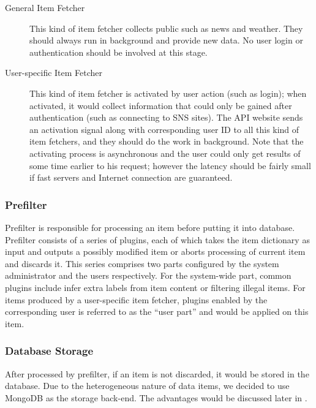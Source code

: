 \begin{description}
\item[General Item Fetcher]\hfill

  This kind of item fetcher collects public
 such as news and weather. They should always run in
  background and provide new data. No user login or authentication
  should be involved at this stage.
\item[User-specific Item Fetcher] \hfill

  This kind of item fetcher is activated by
  user action (such as login); when activated, it would collect
  information that could only be gained after authentication (such as
  connecting to SNS sites). The API website sends an activation signal
  along with corresponding user ID to all this kind of item fetchers,
  and they should do the work in background. Note that the activating
  process is asynchronous and the user could only get results of some
  time earlier to his request; however the latency should be fairly
  small if fast servers and Internet connection are guaranteed.
\end{description}

\subsubsection{Prefilter}

Prefilter is responsible for processing an item before putting it into
database. Prefilter consists of a series of plugins, each of which takes
the item dictionary as input and outputs a possibly modified item or
aborts processing of current item and discards it. This series comprises
two parts configured by the system administrator and the users
respectively. For the system-wide part, common plugins include infer
extra labels from item content or filtering illegal items. For items
produced by a user-specific item fetcher, plugins enabled by the
corresponding user is referred to as the ``user part'' and would be
applied on this item.

\subsubsection{Database Storage}

After processed by prefilter, if an item is not discarded, it would be
stored in the database. Due to the heterogeneous nature of data items,
we decided to use MongoDB as the storage back-end. The advantages would
be discussed later in .

